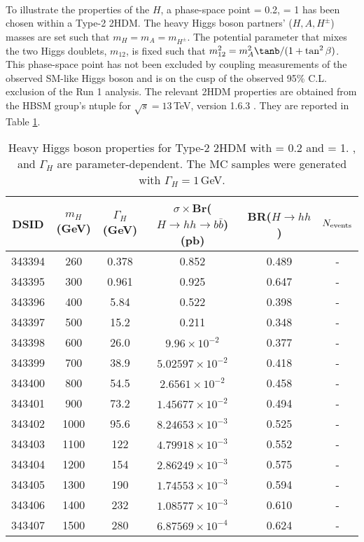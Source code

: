 \paragraph{}
To illustrate the properties of the $H$, a phase-space point \cba = 0.2, \tanb = 1 has been chosen within a Type-2 2HDM. The heavy Higgs boson partners' ($H, A, H^{\pm}$) masses are set such that $m_H = m_A = m_{H^{\pm}}$. The potential parameter that mixes the two Higgs doublets, $m_{12}$, is fixed such that $m_{12}^2 = m_A^2\tanb/(1+\tan^2\beta)$. This phase-space point has not been excluded by coupling measurements of the observed SM-like Higgs boson and is on the cusp of the observed 95\% C.L. exclusion of the Run 1 \Htohhb analysis. The relevant 2HDM properties are obtained from the HBSM group's ntuple for $\sqrt{s} = 13$\,TeV, version 1.6.3 \cite{HBSMNtuple}. They are reported in Table \ref{tab:signal_2hdm_xsec}.

\begin{table}[h]
\begin{center}
\begin{tabular}{c | c | c | c | c | c}\hline
DSID & $m_H$ (GeV) & $\Gamma_H$ (GeV) & $\sigma\times$Br($H\to hh \to b\bar{b}$) (pb) &  BR($H\to hh$) & $N_{\rm{events}}$\\\hline
343394 & 260 & 0.378 & 0.852 				& 0.489 &  -  \\
343395 & 300 & 0.961 & 0.925 				& 0.647 &  - \\
343396 & 400 & 5.84 & 0.522 				& 0.398 &  - \\
343397 & 500 & 15.2 & 0.211 				& 0.348 &  - \\
343398 & 600 & 26.0 & $9.96\times10^{-2}$ 	& 0.377 &  - \\
343399 & 700 & 38.9 &$ 5.02597\times10^{-2}$ & 0.418 &  - \\
343400 & 800 & 54.5 & $2.6561\times10^{-2}$ & 0.458 &  - \\
343401 & 900 & 73.2 & $1.45677\times10^{-2}$ & 0.494 &  - \\
343402 & 1000 & 95.6 & $8.24653\times10^{-3}$ & 0.525 &  - \\
343403 & 1100 & 122 & $4.79918\times10^{-3}$ & 0.552 &  - \\
343404 & 1200 & 154 & $2.86249\times10^{-3}$ & 0.575 &  - \\
343405 & 1300 & 190 & $1.74553\times10^{-3}$ & 0.594 &  - \\
343406 & 1400 & 232 & $1.08577\times10^{-3}$ & 0.610 &  - \\
343407 & 1500 & 280 & $6.87569\times10^{-4}$ & 0.624 &  - \\
\hline
\end{tabular}
\caption{Heavy Higgs boson properties for Type-2 2HDM with \cba = 0.2 and \tanb = 1. \BrHhh, \Brhbb and $\Gamma_H$ are parameter-dependent. The MC samples were generated with $\Gamma_H = 1$\,GeV.}
\label{tab:signal_2hdm_xsec}
\end{center}
\end{table}
 
